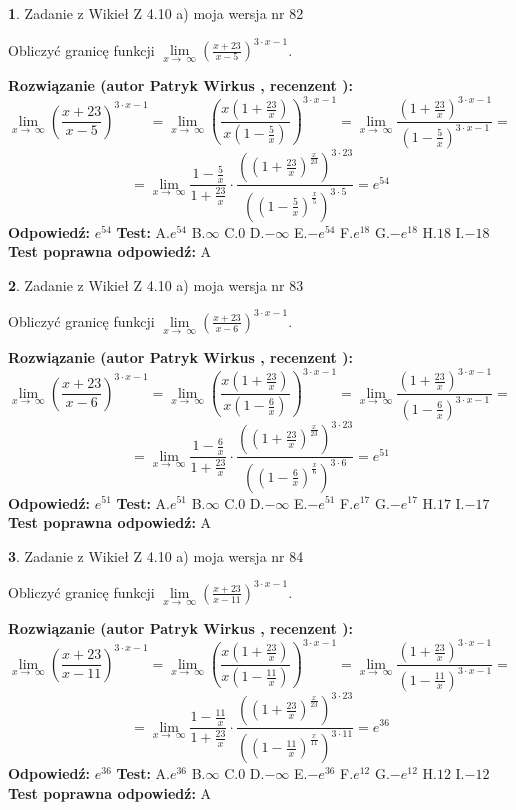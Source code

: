 \documentclass[12pt, a4paper]{article}
\theoremstyle{definition} %
\newtheorem{zad}{}
\newcommand{\zadStart}[1]{\begin{zad}#1\newline}
\newcommand{\zadStop}{\end{zad}}
\newcommand{\rozwStart}[2]{\noindent \textbf{Rozwiązanie (autor #1 , recenzent #2): }\newline}
\newcommand{\rozwStop}{\newline}
\newcommand{\odpStart}{\noindent \textbf{Odpowiedź:}\newline}
\newcommand{\odpStop}{\newline}
\newcommand{\testStart}{\noindent \textbf{Test:}\newline}
\newcommand{\testStop}{\newline}
\newcommand{\kluczStart}{\noindent \textbf{Test poprawna odpowiedź:}\newline}
\newcommand{\kluczStop}{\newline}
\begin{document}
\zadStart{Zadanie z Wikieł Z 4.10 a) moja wersja nr 82}

Obliczyć granicę funkcji  $\lim\limits_{x\to\ \infty}(\frac{x+23}{x-5})^{3\cdot x-1}$.
\zadStop
\rozwStart{Patryk Wirkus}{}
$$\lim\limits_{x\to\ \infty}(\frac{x+23}{x-5})^{3\cdot x-1} = \lim\limits_{x\to\ \infty}(\frac{x(1+\frac{23}{x})}{x(1-\frac{5}{x})})^{3\cdot x-1}=\lim\limits_{x\to\ \infty}\frac{(1+\frac{23}{x})^{3\cdot x-1}}{(1-\frac{5}{x})^{3\cdot x-1}}=$$
$$=\lim\limits_{x\to\ \infty}\frac{1-\frac{5}{x}}{1+\frac{23}{x}}\cdot\frac{((1+\frac{23}{x})^{\frac{x}{23}})^{3\cdot23}}{((1-\frac{5}{x})^{\frac{x}{5}})^{3\cdot5}}=e^{54}$$
\rozwStop
\odpStart
$e^{54}$
\odpStop
\testStart
A.$e^{54}$ B.$\infty$ C.$0$ D.$-\infty$ E.$-e^{54}$
F.$e^{18}$ G.$-e^{18}$
H.$18$
I.$-18$
\testStop
\kluczStart
A
\kluczStop



\zadStart{Zadanie z Wikieł Z 4.10 a) moja wersja nr 83}

Obliczyć granicę funkcji  $\lim\limits_{x\to\ \infty}(\frac{x+23}{x-6})^{3\cdot x-1}$.
\zadStop
\rozwStart{Patryk Wirkus}{}
$$\lim\limits_{x\to\ \infty}(\frac{x+23}{x-6})^{3\cdot x-1} = \lim\limits_{x\to\ \infty}(\frac{x(1+\frac{23}{x})}{x(1-\frac{6}{x})})^{3\cdot x-1}=\lim\limits_{x\to\ \infty}\frac{(1+\frac{23}{x})^{3\cdot x-1}}{(1-\frac{6}{x})^{3\cdot x-1}}=$$
$$=\lim\limits_{x\to\ \infty}\frac{1-\frac{6}{x}}{1+\frac{23}{x}}\cdot\frac{((1+\frac{23}{x})^{\frac{x}{23}})^{3\cdot23}}{((1-\frac{6}{x})^{\frac{x}{6}})^{3\cdot6}}=e^{51}$$
\rozwStop
\odpStart
$e^{51}$
\odpStop
\testStart
A.$e^{51}$ B.$\infty$ C.$0$ D.$-\infty$ E.$-e^{51}$
F.$e^{17}$ G.$-e^{17}$
H.$17$
I.$-17$
\testStop
\kluczStart
A
\kluczStop



\zadStart{Zadanie z Wikieł Z 4.10 a) moja wersja nr 84}

Obliczyć granicę funkcji  $\lim\limits_{x\to\ \infty}(\frac{x+23}{x-11})^{3\cdot x-1}$.
\zadStop
\rozwStart{Patryk Wirkus}{}
$$\lim\limits_{x\to\ \infty}(\frac{x+23}{x-11})^{3\cdot x-1} = \lim\limits_{x\to\ \infty}(\frac{x(1+\frac{23}{x})}{x(1-\frac{11}{x})})^{3\cdot x-1}=\lim\limits_{x\to\ \infty}\frac{(1+\frac{23}{x})^{3\cdot x-1}}{(1-\frac{11}{x})^{3\cdot x-1}}=$$
$$=\lim\limits_{x\to\ \infty}\frac{1-\frac{11}{x}}{1+\frac{23}{x}}\cdot\frac{((1+\frac{23}{x})^{\frac{x}{23}})^{3\cdot23}}{((1-\frac{11}{x})^{\frac{x}{11}})^{3\cdot11}}=e^{36}$$
\rozwStop
\odpStart
$e^{36}$
\odpStop
\testStart
A.$e^{36}$ B.$\infty$ C.$0$ D.$-\infty$ E.$-e^{36}$
F.$e^{12}$ G.$-e^{12}$
H.$12$
I.$-12$
\testStop
\kluczStart
A
\kluczStop
\end{document}
